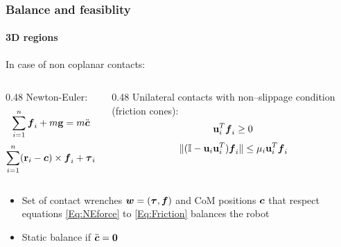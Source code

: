 \documentclass[10pt]{beamer}
\begin{document}
\begin{frame}
  \frametitle{Balance and feasiblity}
  \framesubtitle{3D regions}
  In case of non coplanar contacts:
  \vfill
  \begin{columns}[T]
    \begin{column}{0.48\textwidth}
      Newton-Euler:
      \begin{equation}\label{Eq:NEforce}
        \sum_{i=1}^{n} \boldsymbol{f}_{i} + m\mathbf{g} = m\ddot{\boldsymbol{c}}
      \end{equation}
      \begin{equation}\label{Eq:NEmoments}
        \sum_{i=1}^{n} (\mathbf{r}_{i} - \boldsymbol{c}) \times \boldsymbol{f}_{i} + \boldsymbol{\tau}_{i} = \boldsymbol{\dot{L}}
      \end{equation}
    \end{column}

    \begin{column}{0.48\textwidth}
      Unilateral contacts with non--slippage condition (friction cones):
      \begin{equation}\label{Eq:Unilateral}
        \mathbf{u}_i^T \boldsymbol{f}_i \geq 0
      \end{equation}
      \begin{equation}\label{Eq:Friction}
        \|(\mathbb{I}-\mathbf{u}_i \mathbf{u}_i^T)\boldsymbol{f}_i \| \leq \mu_i \mathbf{u}_i^T \boldsymbol{f}_i
      \end{equation}
    \end{column}
  \end{columns}

  \hfill
  \begin{itemize}
    \item Set of contact wrenches $\boldsymbol{w} = (\boldsymbol{\tau},\boldsymbol{f})$ and CoM positions $\boldsymbol{c}$ that respect
      equations \eqref{Eq:NEforce} to \eqref{Eq:Friction} balances the robot
    \item Static balance if $\ddot{\boldsymbol{c}} = \mathbf{0}$
  \end{itemize}

\end{frame}
\end{document}

